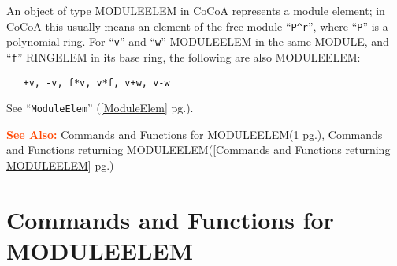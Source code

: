 \documentclass[a4paper]{mybook}
\newcommand\SeeAlso{\par\textcolor{OrangeRed}{\textbf{\large See Also: }}}
\begin{document}
        
An object of type MODULEELEM in CoCoA represents a module element;
in CoCoA this usually means an element of the free module ``\verb&P^r&'',
where ``\verb&P&'' is a polynomial ring.
For ``\verb&v&'' and ``\verb&w&'' MODULEELEM in the same MODULE,
and ``\verb&f&'' RINGELEM in its base ring, the following are also MODULEELEM:
\begin{verbatim}
   +v, -v, f*v, v*f, v+w, v-w
\end{verbatim}
See ``\verb&ModuleElem&'' (\ref{ModuleElem} pg.\pageref{ModuleElem}).

\SeeAlso %
  Commands and Functions for MODULEELEM(\ref{Commands and Functions for MODULEELEM} pg.\pageref{Commands and Functions for MODULEELEM}), 
    Commands and Functions returning MODULEELEM(\ref{Commands and Functions returning MODULEELEM} pg.\pageref{Commands and Functions returning MODULEELEM})

\section{Commands and Functions for MODULEELEM}
\label{Commands and Functions for MODULEELEM}

        
\end{document}
